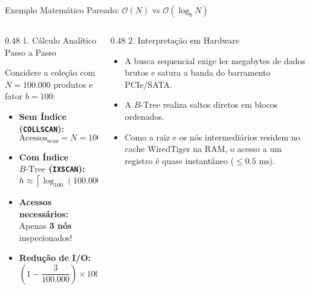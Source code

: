 \begin{frame}{Exemplo Matemático Pareado: $\mathcal{O}(N)$ vs $\mathcal{O}(\log_{b} N)$}
  \vspace{-0.1cm}
  \begin{columns}[t]
    \begin{column}{0.48\textwidth}
      \alert{1. Cálculo Analítico Passo a Passo}\par
      \tiny
      Considere a coleção com $N = 100.000$ produtos e fator $b = 100$:
      \begin{itemize}
        \item \textbf{Sem Índice (\texttt{COLLSCAN}):}
          $$\text{Acessos}_{\text{scan}} = N = 100.000 \text{ documentos lidos}$$
        \item \textbf{Com Índice $B\text{-Tree}$ (\texttt{IXSCAN}):}
          $$h \approx \left\lceil \log_{100}(100.000) \right\rceil = \lceil 2.5 \rceil = 3$$
        \item \textbf{Acessos necessários:} Apenas \textbf{3 nós} inspecionados!
        \item \textbf{Redução de I/O:}
          $$\left( 1 - \frac{3}{100.000} \right) \times 100\% = \mathbf{99.997\%}$$
      \end{itemize}
    \end{column}
    \begin{column}{0.48\textwidth}
      \alert{2. Interpretação em Hardware}\par
      \tiny
      \begin{itemize}
        \item A busca sequencial exige ler megabytes de dados brutos e satura a banda do barramento PCIe/SATA.
        \item A $B\text{-Tree}$ realiza saltos diretos em blocos ordenados.
        \item Como a raiz e os nós intermediários residem no cache WiredTiger na RAM, o acesso a um registro é quase instantâneo ($\le 0.5\text{ ms}$).
      \end{itemize}
    \end{column}
  \end{columns}
\end{frame}

